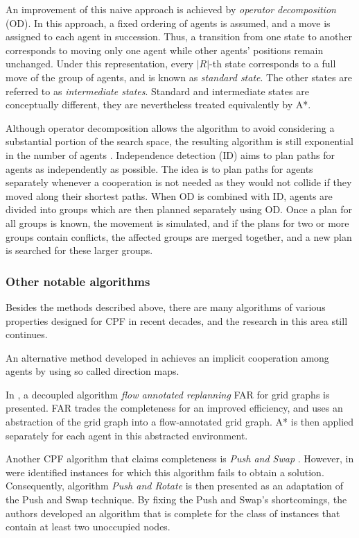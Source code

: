 An improvement of this naive approach is achieved by \emph{operator decomposition} (OD)\cite{standley10}.
In this approach, a fixed ordering of agents is assumed, and a move is assigned to each agent in succession.
Thus, a transition from one state to another corresponds to  moving only one agent while other agents' positions remain unchanged.
Under this representation, every $|R|$-th state corresponds to a full move of the group of agents, and is known as \emph{standard state}. 
The other states are referred to as \emph{intermediate states}.
Standard and intermediate states are conceptually different, they are nevertheless treated equivalently by A*.

Although operator decomposition allows the algorithm to avoid considering a substantial portion of the search space, the resulting algorithm is still exponential in the number of agents \cite{standley10}.
Independence detection (ID) aims to plan paths for agents as independently as possible.
The idea is to plan paths for agents separately whenever a cooperation is not needed as they would not collide if they moved along their shortest paths.
When OD is combined with ID, agents are divided into groups which are then planned separately using OD.
Once a plan for all groups is known, the movement is simulated, and if the plans for two or more groups contain conflicts,
the affected groups are merged together, and a new plan is searched for these larger groups.

\subsubsection{Other notable algorithms}

Besides the methods described above, there are many algorithms of various properties designed for CPF in recent decades, and the research in this area still continues. 

An alternative method developed in \cite{jansen08} achieves an implicit cooperation among agents by using so called direction maps.

In \cite{wang08}, a decoupled algorithm \emph{flow annotated replanning} FAR for grid graphs is presented.
FAR trades the completeness for an improved efficiency, and uses an abstraction of the grid graph into a flow-annotated grid graph.
A* is then applied separately for each agent in this abstracted environment.

Another CPF algorithm that claims completeness is \emph{Push and Swap} \cite{luna11}. 
However, in \cite{wilde13} were identified instances for which this algorithm fails to obtain a solution.
Consequently, algorithm \emph{Push and Rotate} is then presented as an adaptation of the Push and Swap technique. 
By fixing the Push and Swap’s shortcomings, the authors developed an algorithm that is complete for the class of instances that contain at least two unoccupied nodes.

